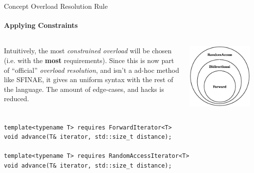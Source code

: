 \documentclass{beamer}
\begin{document}
    \begin{frame}[fragile]{Concept Overload Resolution Rule}
        \framesubtitle{Applying Constraints}
        \begin{columns}
            Intuitively, the most \emph{constrained overload} will be chosen (i.e. with the \textbf{most} requirements). Since this is now part of ``official'' \emph{overload resolution}, and isn't a ad-hoc method like SFINAE, it gives an uniform syntax with the rest of the language. The amount of edge-cases, and hacks is reduced.
            \vspace{-1.5em}
            \begin{center}
                \includegraphics[width=\textwidth]{figures/iterators.eps}
            \end{center}
        \end{columns}
        \begin{center}
        \begin{lstlisting}[caption={function overloading for \texttt{advance} based on type constraint.}]
template<typename T> requires ForwardIterator<T>
void advance(T& iterator, std::size_t distance);

template<typename T> requires RandomAccessIterator<T>
void advance(T& iterator, std::size_t distance); \end{lstlisting}
        \end{center}
    \end{frame}
\end{document}
